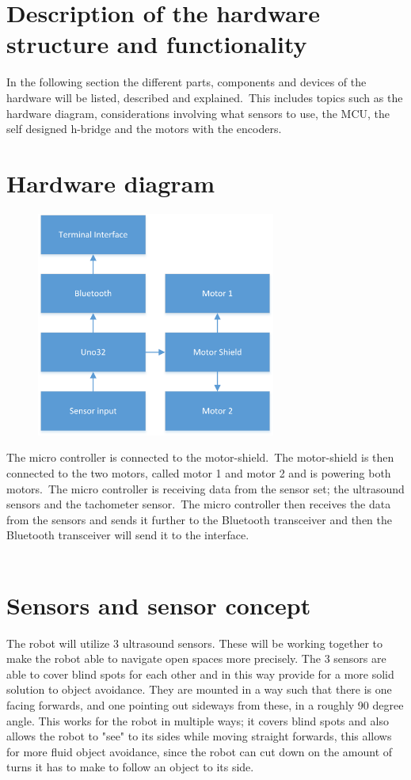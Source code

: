 \section{Description of the hardware structure and functionality}
In the following section the different parts, components and devices of the hardware will be listed, described and explained.\
This includes topics such as the hardware diagram, considerations involving what sensors to use, the MCU, the self designed h-bridge and the motors with the encoders.

\section{Hardware diagram}
\begin{figure}[!ht]
	\centering
	\includegraphics[width=0.7\textwidth]{figures/UdklipDIA2.png}
	\caption{}
	\label{Hardware diagram}
\end{figure}

The micro controller is connected to the motor-shield.\ The motor-shield is then connected to the two motors, called motor 1 and motor 2 and is powering both motors.\ The micro controller is receiving data from the sensor set; the ultrasound sensors and the tachometer sensor.\ The micro controller then receives the data from the sensors and sends it further to the Bluetooth transceiver and then the Bluetooth transceiver will send it to the interface. \\ \\

\section{Sensors and sensor concept}
The robot will utilize 3 ultrasound sensors. These will be working together to make the robot able to navigate open spaces more precisely. The 3 sensors are able to cover blind spots for each other and in this way provide for a more solid solution to object avoidance. They are mounted in a way such that there is one facing forwards, and one pointing out sideways from these, in a roughly 90 degree angle. This works for the robot in multiple ways; it covers blind spots and also allows the robot to "see" to its sides while moving straight forwards, this allows for more fluid object avoidance, since the robot can cut down on the amount of turns it has to make to follow an object to its side.

